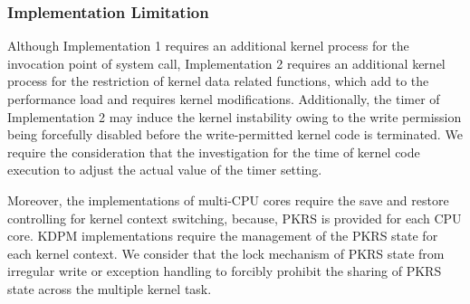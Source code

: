 \subsubsection{Implementation Limitation}
Although Implementation 1 requires an additional kernel process for the
invocation point of system call,
%
Implementation 2 requires an additional kernel process for the restriction of
kernel data related functions, which add to the performance load and requires
kernel modifications. 
%
Additionally, the timer of Implementation 2 may induce the kernel instability
owing to the write permission being forcefully disabled before the
write-permitted kernel code is terminated. We require the consideration that the
investigation for the time of kernel code execution to adjust the actual value
of the timer setting.
%

Moreover, the implementations of multi-CPU cores require the save and restore
controlling for kernel context switching, because, PKRS is provided for each CPU
core. KDPM implementations require the management of the PKRS state for each
kernel context. We consider that the lock mechanism of PKRS state from irregular
write or exception handling to forcibly prohibit the sharing of PKRS state
across the multiple kernel task.



